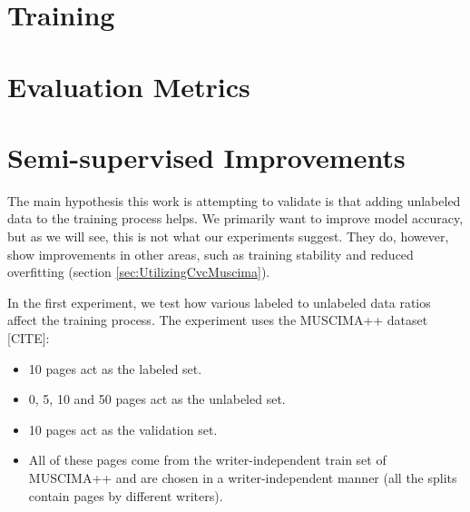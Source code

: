 \section{Training}
\label{sec:Training}



\section{Evaluation Metrics}
\label{sec:EvaluationMetrics}




\section{Semi-supervised Improvements}
\label{sec:SemisupervisedImprovements}

The main hypothesis this work is attempting to validate is that adding unlabeled data to the training process helps. We primarily want to improve model accuracy, but as we will see, this is not what our experiments suggest. They do, however, show improvements in other areas, such as training stability and reduced overfitting (section \ref{sec:UtilizingCvcMuscima}).

In the first experiment, we test how various labeled to unlabeled data ratios affect the training process. The experiment uses the MUSCIMA++ dataset [CITE]:

\begin{itemize}
    \item 10 pages act as the labeled set.
    \item 0, 5, 10 and 50 pages act as the unlabeled set.
    \item 10 pages act as the validation set.
    \item All of these pages come from the writer-independent train set of MUSCIMA++ and are chosen in a writer-independent manner (all the splits contain pages by different writers).
\end{itemize}

